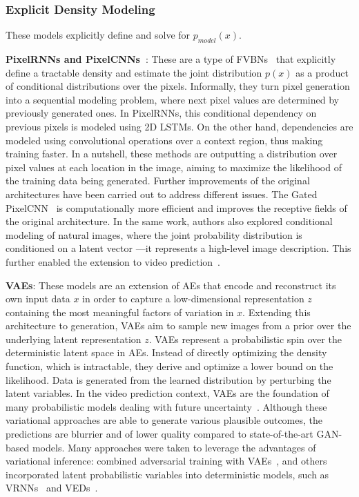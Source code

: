\subsubsection{Explicit Density Modeling}
These models explicitly define and solve for $p_{model}(x)$. 

\vspace*{0.1cm}\noindent\textbf{PixelRNNs and PixelCNNs~\cite{Oord2016}}: These are a type of \acp{FVBN}~\cite{Neal1992,Bengio1999} that explicitly define a tractable density and estimate the joint distribution $p(x)$ as a product of conditional distributions over the pixels. Informally, they turn pixel generation into a sequential modeling problem, where next pixel values are determined by previously generated ones. In PixelRNNs, this conditional dependency on previous pixels is modeled using \ac{2D} \acp{LSTM}. On the other hand, dependencies are modeled using convolutional operations over a context region, thus making training faster. In a nutshell, these methods are outputting a distribution over pixel values at each location in the image, aiming to maximize the likelihood of the training data being generated. Further improvements of the original architectures have been carried out to address different issues. The Gated PixelCNN~\cite{Oord2016a} is computationally more efficient and improves the receptive fields of the original architecture. In the same work, authors also explored conditional modeling of natural images, where the joint probability distribution is conditioned on a latent vector ---it represents a high-level image description. This further enabled the extension to video prediction~\cite{Kalchbrenner2016}. 

\vspace*{0.1cm}\noindent\textbf{\acp{VAE}}: These models are an extension of \acp{AE} that encode and reconstruct its own input data $x$ in order to capture a low-dimensional representation $z$ containing the most meaningful factors of variation in $x$. Extending this architecture to generation, \acp{VAE} aim to sample new images from a prior over the underlying latent representation $z$. \acp{VAE} represent a probabilistic spin over the deterministic latent space in \acp{AE}. Instead of directly optimizing the density function, which is intractable, they derive and optimize a lower bound on the likelihood. Data is generated from the learned distribution by perturbing the latent variables. In the video prediction context, \acp{VAE} are the foundation of many probabilistic models dealing with future uncertainty~\cite{Liang2017,Babaeizadeh2018,Denton2018,Fragkiadaki2017,Castrejon2019,Bhattacharyya2019,Minderer2019}. Although these variational approaches are able to generate various plausible outcomes, the predictions are blurrier and of lower quality compared to state-of-the-art \ac{GAN}-based models. Many approaches were taken to leverage the advantages of variational inference: combined adversarial training with \acp{VAE}~\cite{Liang2017}, and others incorporated latent probabilistic variables into deterministic models, such as \acp{VRNN}~\cite{Chung2015,Castrejon2019} and \acp{VED}~\cite{Henaff2017}.

